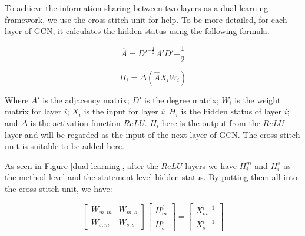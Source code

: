 
To achieve the information sharing between two layers as a dual learning framework, we use the cross-stitch unit \cite{misra2016cross} for help. To be more detailed, for each layer of GCN, it calculates the hidden status using the following formula.



\begin{equation}\label{eq:1}
	\hat{A} = D'^{-\frac{1}{2}}A'D'{-\frac{1}{2}}
\end{equation}

\begin{equation}\label{eq:2}
	H_i = \Delta(\hat{A}X_iW_i)
\end{equation}

Where $A'$ is the adjacency matrix; $D'$ is the degree matrix; $W_i$ is the weight matrix for layer $i$; $X_i$ is the input for layer $i$; $H_i$ is the hidden status of layer $i$; and $\Delta$ is the activation function $ReLU$. $H_i$ here is the output from the $ReLU$ layer and will be regarded as the input of the next layer of GCN. The cross-stitch unit is suitable to be added here.

As seen in Figure \ref{dual-learning}, after the $ReLU$ layers we have $H_i^m$ and $H_i^s$ as the method-level and the statement-level hidden status. By putting them all into the cross-stitch unit, we have:

\begin{equation}\label{eq:3}
	\begin{bmatrix}
		W_{m,m} &  W_{m,s} \\
		W_{s,m} &  W_{s,s}
	\end{bmatrix}
	\begin{bmatrix}
		H_m^{i}\\
		H_s^{i}
	\end{bmatrix}=
	\begin{bmatrix}
		X_m^{i+1}\\
		X_s^{i+1}
	\end{bmatrix}
\end{equation}

